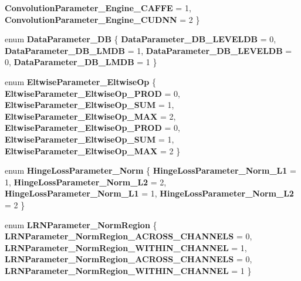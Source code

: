 \begin{DoxyCompactItemize}
\newline
{\bfseries Convolution\+Parameter\+\_\+\+Engine\+\_\+\+C\+A\+F\+FE} = 1, 
{\bfseries Convolution\+Parameter\+\_\+\+Engine\+\_\+\+C\+U\+D\+NN} = 2
 \}
\item 
\mbox{\label{namespacecaffe_a3f504378790e796a9c104d7632889c1a}} 
enum {\bfseries Data\+Parameter\+\_\+\+DB} \{ {\bfseries Data\+Parameter\+\_\+\+D\+B\+\_\+\+L\+E\+V\+E\+L\+DB} = 0, 
{\bfseries Data\+Parameter\+\_\+\+D\+B\+\_\+\+L\+M\+DB} = 1, 
{\bfseries Data\+Parameter\+\_\+\+D\+B\+\_\+\+L\+E\+V\+E\+L\+DB} = 0, 
{\bfseries Data\+Parameter\+\_\+\+D\+B\+\_\+\+L\+M\+DB} = 1
 \}
\item 
\mbox{\label{namespacecaffe_aa66d3ac81476392e5c6fd34c1115fe41}} 
enum {\bfseries Eltwise\+Parameter\+\_\+\+Eltwise\+Op} \{ \newline
{\bfseries Eltwise\+Parameter\+\_\+\+Eltwise\+Op\+\_\+\+P\+R\+OD} = 0, 
{\bfseries Eltwise\+Parameter\+\_\+\+Eltwise\+Op\+\_\+\+S\+UM} = 1, 
{\bfseries Eltwise\+Parameter\+\_\+\+Eltwise\+Op\+\_\+\+M\+AX} = 2, 
{\bfseries Eltwise\+Parameter\+\_\+\+Eltwise\+Op\+\_\+\+P\+R\+OD} = 0, 
\newline
{\bfseries Eltwise\+Parameter\+\_\+\+Eltwise\+Op\+\_\+\+S\+UM} = 1, 
{\bfseries Eltwise\+Parameter\+\_\+\+Eltwise\+Op\+\_\+\+M\+AX} = 2
 \}
\item 
\mbox{\label{namespacecaffe_a2fc3a666d590e3b2212b2b436c2b805b}} 
enum {\bfseries Hinge\+Loss\+Parameter\+\_\+\+Norm} \{ {\bfseries Hinge\+Loss\+Parameter\+\_\+\+Norm\+\_\+\+L1} = 1, 
{\bfseries Hinge\+Loss\+Parameter\+\_\+\+Norm\+\_\+\+L2} = 2, 
{\bfseries Hinge\+Loss\+Parameter\+\_\+\+Norm\+\_\+\+L1} = 1, 
{\bfseries Hinge\+Loss\+Parameter\+\_\+\+Norm\+\_\+\+L2} = 2
 \}
\item 
\mbox{\label{namespacecaffe_addc128ae9c954b2ed118b08114995770}} 
enum {\bfseries L\+R\+N\+Parameter\+\_\+\+Norm\+Region} \{ {\bfseries L\+R\+N\+Parameter\+\_\+\+Norm\+Region\+\_\+\+A\+C\+R\+O\+S\+S\+\_\+\+C\+H\+A\+N\+N\+E\+LS} = 0, 
{\bfseries L\+R\+N\+Parameter\+\_\+\+Norm\+Region\+\_\+\+W\+I\+T\+H\+I\+N\+\_\+\+C\+H\+A\+N\+N\+EL} = 1, 
{\bfseries L\+R\+N\+Parameter\+\_\+\+Norm\+Region\+\_\+\+A\+C\+R\+O\+S\+S\+\_\+\+C\+H\+A\+N\+N\+E\+LS} = 0, 
{\bfseries L\+R\+N\+Parameter\+\_\+\+Norm\+Region\+\_\+\+W\+I\+T\+H\+I\+N\+\_\+\+C\+H\+A\+N\+N\+EL} = 1
 \}
\item 

\end{DoxyCompactItemize}
